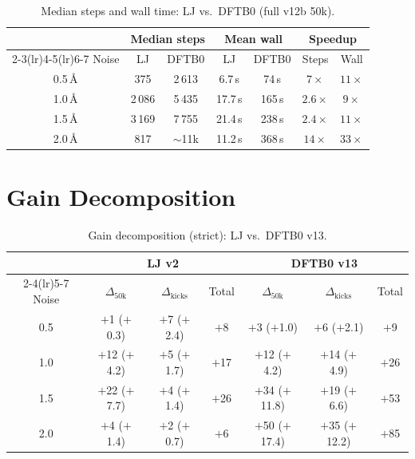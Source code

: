 \documentclass[11pt,a4paper]{article}
\theoremstyle{definition}
\begin{document}
\begin{table}[h]
\centering\small
\caption{Median steps and wall time: LJ vs.\ DFTB0 (full v12b 50k).}
\begin{tabular}{ccccccc}
\toprule
 & \multicolumn{2}{c}{Median steps} & \multicolumn{2}{c}{Mean wall} & \multicolumn{2}{c}{Speedup} \\
\cmidrule(lr){2-3}\cmidrule(lr){4-5}\cmidrule(lr){6-7}
Noise & LJ & DFTB0 & LJ & DFTB0 & Steps & Wall \\
\midrule
0.5\,\AA & 375  & 2\,613  & 6.7\,s  & 74\,s   & $7\times$ & $11\times$ \\
1.0\,\AA & 2\,086 & 5\,435 & 17.7\,s & 165\,s  & $2.6\times$ & $9\times$ \\
1.5\,\AA & 3\,169 & 7\,755 & 21.4\,s & 238\,s  & $2.4\times$ & $11\times$ \\
2.0\,\AA & 817  & ${\sim}$11k & 11.2\,s & 368\,s  & $14\times$ & $33\times$ \\
\bottomrule
\end{tabular}
\end{table}

\section{Gain Decomposition}
\label{app:gains}

\begin{table}[h]
\centering\small
\caption{Gain decomposition (strict): LJ vs.\ DFTB0 v13.}
\begin{tabular}{ccccccc}
\toprule
 & \multicolumn{3}{c}{LJ v2} & \multicolumn{3}{c}{DFTB0 v13} \\
\cmidrule(lr){2-4}\cmidrule(lr){5-7}
Noise & $\Delta_\text{50k}$ & $\Delta_\text{kicks}$ & Total
      & $\Delta_\text{50k}$ & $\Delta_\text{kicks}$ & Total \\
\midrule
0.5 & $+$1 ($+$0.3) & $+$7 ($+$2.4) & $+$8
    & $+$3 ($+$1.0) & $+$6 ($+$2.1) & $+$9 \\
1.0 & $+$12 ($+$4.2) & $+$5 ($+$1.7) & $+$17
    & $+$12 ($+$4.2) & $+$14 ($+$4.9) & $+$26 \\
1.5 & $+$22 ($+$7.7) & $+$4 ($+$1.4) & $+$26
    & $+$34 ($+$11.8) & $+$19 ($+$6.6) & $+$53 \\
2.0 & $+$4 ($+$1.4) & $+$2 ($+$0.7) & $+$6
    & $+$50 ($+$17.4) & $+$35 ($+$12.2) & $+$85 \\
\bottomrule
\end{tabular}
\end{table}
\end{document}
